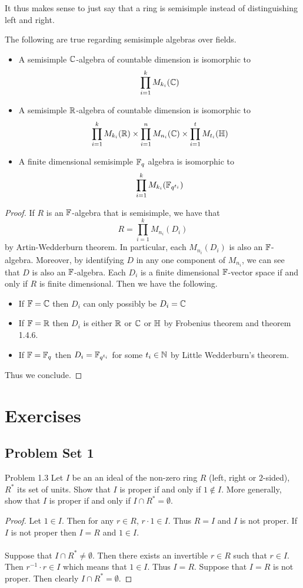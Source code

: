 \documentclass[a4paper]{article}
\begin{document}
It thus makes sense to just say that a ring is semisimple instead of distinguishing left and right. 

\begin{prp}{}{} The following are true regarding semisimple algebras over fields. 
\begin{itemize}
\item A semisimple $\mathbb{C}$-algebra of countable dimension is isomorphic to $$\prod_{i=1}^kM_{k_i}(\mathbb{C})$$
\item A semisimple $\mathbb{R}$-algebra of countable dimension is isomorphic to $$\prod_{i=1}^kM_{k_i}(\mathbb{R})\times\prod_{i=1}^nM_{n_i}(\mathbb{C})\times\prod_{i=1}^tM_{t_i}(\mathbb{H})$$
\item A finite dimensional semisimple $\mathbb{F}_q$ algebra is isomorphic to $$\prod_{i=1}^k M_{k_i}(\mathbb{F}_{q^{t_i}})$$
\end{itemize} \tcbline
\begin{proof}
If $R$ is an $\mathbb{F}$-algebra that is semisimple, we have that $$R=\prod_{i=1}^kM_{n_i}(D_i)$$ by Artin-Wedderburn theorem. In particular, each $M_{n_i}(D_i)$ is also an $\mathbb{F}$-algebra. Moreover, by identifying $D$ in any one component of $M_{n_i}$, we can see that $D$ is also an $\mathbb{F}$-algebra. Each $D_i$ is a finite dimensional $\mathbb{F}$-vector space if and only if $R$ is finite dimensional. Then we have the following. 
\begin{itemize}
\item If $\mathbb{F}=\mathbb{C}$ then $D_i$ can only possibly be $D_i=\mathbb{C}$
\item If $\mathbb{F}=\mathbb{R}$ then $D_i$ is either $\mathbb{R}$ or $\mathbb{C}$ or $\mathbb{H}$ by Frobenius theorem and theorem 1.4.6. 
\item If $\mathbb{F}=\mathbb{F}_{q}$ then $D_i=\mathbb{F}_{q^{t_i}}$ for some $t_i\in\mathbb{N}$ by Little Wedderburn's theorem. 
\end{itemize}
Thus we conclude. 
\end{proof}
\end{prp}

\pagebreak
\section{Exercises}
\subsection{Problem Set 1}
\begin{ex}{Problem 1.3}{} Let $I$ be an an ideal of the non-zero ring $R$ (left, right or $2$-sided), $R^\ast$ its set of units. Show that $I$ is proper if and only if $1\notin I$. More generally, show that $I$ is proper if and only if $I\cap R^\ast=\emptyset$. \tcbline
\begin{proof}
Let $1\in I$. Then for any $r\in R$, $r\cdot 1\in I$. Thus $R=I$ and $I$ is not proper. If $I$ is not proper then $I=R$ and $1\in I$. \\~\\

Suppose that $I\cap R^\ast\neq\emptyset$. Then there exists an invertible $r\in R$ such that $r\in I$. Then $r^{-1}\cdot r\in I$ which means that $1\in I$. Thus $I=R$. Suppose that $I=R$ is not proper. Then clearly $I\cap R^\ast=\emptyset$. 
\end{proof}
\end{ex}
\end{document}
